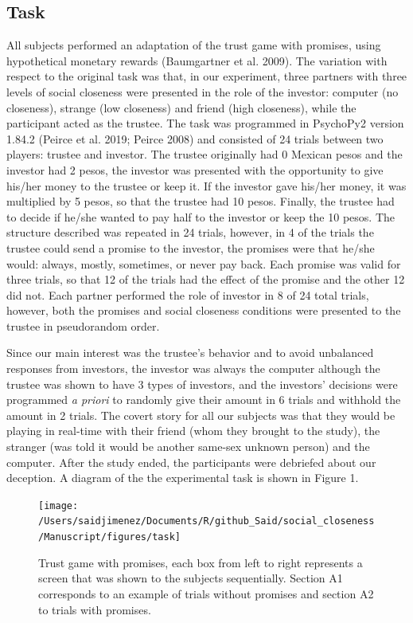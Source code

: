 \documentclass[smallextended]{svjour3}       %
\begin{document}
\hypertarget{task}{%
\subsection{Task}\label{task}}

All subjects performed an adaptation of the trust game with promises,
using hypothetical monetary rewards (Baumgartner et al. 2009). The
variation with respect to the original task was that, in our experiment,
three partners with three levels of social closeness were presented in
the role of the investor: computer (no closeness), strange (low
closeness) and friend (high closeness), while the participant acted as
the trustee. The task was programmed in PsychoPy2 version 1.84.2 (Peirce
et al. 2019; Peirce 2008) and consisted of 24 trials between two
players: trustee and investor. The trustee originally had 0 Mexican
pesos and the investor had 2 pesos, the investor was presented with the
opportunity to give his/her money to the trustee or keep it. If the
investor gave his/her money, it was multiplied by 5 pesos, so that the
trustee had 10 pesos. Finally, the trustee had to decide if he/she
wanted to pay half to the investor or keep the 10 pesos. The structure
described was repeated in 24 trials, however, in 4 of the trials the
trustee could send a promise to the investor, the promises were that
he/she would: always, mostly, sometimes, or never pay back. Each promise
was valid for three trials, so that 12 of the trials had the effect of
the promise and the other 12 did not. Each partner performed the role of
investor in 8 of 24 total trials, however, both the promises and social
closeness conditions were presented to the trustee in pseudorandom
order.

Since our main interest was the trustee's behavior and to avoid
unbalanced responses from investors, the investor was always the
computer although the trustee was shown to have 3 types of investors,
and the investors' decisions were programmed \emph{a priori} to randomly
give their amount in 6 trials and withhold the amount in 2 trials. The
covert story for all our subjects was that they would be playing in
real-time with their friend (whom they brought to the study), the
stranger (was told it would be another same-sex unknown person) and the
computer. After the study ended, the participants were debriefed about
our deception. A diagram of the the experimental task is shown in Figure
1.

\begin{figure}

{\centering \texttt{[image: /Users/saidjimenez/Documents/R/github\_Said/social\_closeness/Manuscript/figures/task]} 

}

\caption{Trust game with promises, each box from left to right represents a screen that was shown to the subjects sequentially. Section A1 corresponds to an example of trials without promises and section A2 to trials with promises.}\label{fig:figA}
\end{figure}
\end{document}
